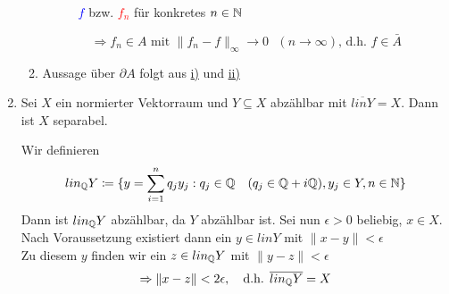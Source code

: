 \begin{beispiel}
\begin{enumerate}[label=\alph*\upshape)]
\begin{beweis}
\begin{enumerate}
						\begin{center}
						  \begin{figure}[H]
							\begin{center}		
							\end{center}
							\caption{\textcolor{blue}{$f$} bzw. \textcolor{red}{$f_{n}$} für konkretes $n \in \mathbb{N}$}
						  \end{figure}
						\end{center}
						\[ \Rightarrow f_{n} \in A \text{ mit } \| f_{n} - f \|_{\infty} \rightarrow 0 \text{ } (n \rightarrow \infty) \text{, d.h. } f \in \bar A \]
					\item Aussage über $\partial A$ folgt aus \hyperref[bsp:4.11.b]{i)} und \hyperref[bsp:4.11.b]{ii)}
				\end{enumerate}
			\end{beweis}
		\item Sei $X$ ein normierter Vektorraum und $Y \subseteq X$ abzählbar mit $\overline{lin Y} = X$. Dann ist $X$ separabel.
			\begin{beweis}
				Wir definieren
				\[ lin_{\mathbb{Q}} Y \coloneqq \{ y = \sum_{i = 1}^{n} q_{j} y_{j} : q_{j} \in \mathbb{Q} \quad (q_{j} \in \mathbb{Q} + i \mathbb{Q} ), y_{j} \in Y, n \in \mathbb{N} \} \]
				Dann ist $lin_{\mathbb{Q}} Y$ abzählbar, da $Y$ abzählbar ist. Sei nun $\epsilon > 0$ beliebig, $x \in X$. \\
				Nach Voraussetzung existiert dann ein $y \in lin Y$ mit $\| x - y \| < \epsilon$ \\
				Zu diesem $y$ finden wir ein $z \in lin_{\mathbb{Q}} Y$ mit $\| y - z \| < \epsilon$
				\[ \Rightarrow \| x - z \| < 2 \epsilon, \quad \text{d.h. } \overline{lin_{\mathbb{Q}} Y} = X \]

\end{beweis}
\end{enumerate}
\end{beispiel}
